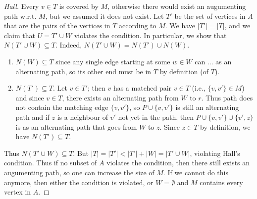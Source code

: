\documentclass[12pt, a4paper]{book}
\theoremstyle{nonumberplain}
\newtheorem{proof}{Proof}
\begin{document}
\begin{proof}[Hall]
    Every $v\in T$ is covered by $M$, otherwise there would exist an augumenting path w.r.t. $M$, but we assumed it does not exist.
    Let $T'$ be the set of vertices in $A$ that are the pairs of the vertices in $T$ according to $M$.
    We have $|T'|=|T|$, and we claim that $U=T'\cup W$ violates the condition.
    In particular, we show that $N(T'\cup W)\subseteq T$.
    Indeed, $N(T'\cup W)=N(T')\cup N(W)$.
    \begin{enumerate}[nolistsep]
        \item $N(W)\subseteq T$ since any single edge starting at some $w\in W$ can ... as an alternating path, so its other end must be in $T$ by definition (of $T$).
        \item $N(T')\subseteq T$.
            Let $v\in T'$; then $v$ has a matched pair $v\in T$ (i.e., $\{v,v'\}\in M$) and since $v\in T$, there exists an alternating path from $W$ to $r$.
            Thus path does not contain the matching edge $\{v,v'\}$, so $P\cup\{v,v'\}$ is still an alternating path and if $z$ is a neighbour of $v'$ not yet in the path, then $P\cup\{v,v'\}\cup \{v',z\}$ is as an alternating path that goes from $W$ to $z$.
            Since $z\in T$ by definition, we have $N(T')\subseteq T$.
    \end{enumerate}
    Thus $N(T'\cup W)\subseteq T$.
    But $|T|=|T'|<|T'|+|W|=|T'\cup W|$, violating Hall's condition.
    Thus if no subset of $A$ violates the condition, then there still exists an augumenting path, so one can increase the size of $M$.
    If we cannot do this anymore, then either the condition is violated, or $W=\emptyset$ and $M$ contains every vertex in $A$.
\end{proof}
\end{document}
